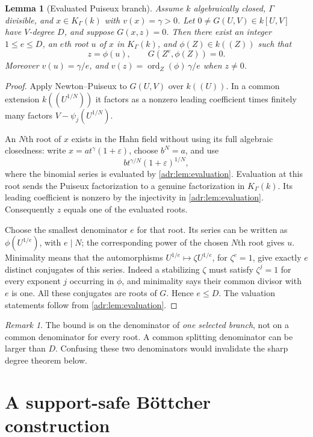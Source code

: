 \documentclass[11pt,letterpaper]{article}
\numberwithin{equation}{section}
\newtheorem{lemma}[lemma]{Lemma}
\theoremstyle{definition}
\theoremstyle{remark}
\newtheorem{remark}[remark]{Remark}
\newcommand{\K}{K_\Gamma(k)}
\newcommand{\ord}{\operatorname{ord}}
\begin{document}
\begin{lemma}[Evaluated Puiseux branch]\label{adr:lem:puiseux}
Assume $k$ algebraically closed, $\Gamma$ divisible, and $x\in\K$ with
$v(x)=\gamma>0$. Let $0\ne G(U,V)\in k[U,V]$ have $V$-degree $D$, and
suppose $G(x,z)=0$. Then there exist an integer $1\le e\le D$, an
$e$th root $u$ of $x$ in $\K$, and $\phi(Z)\in k((Z))$ such that
\begin{equation}\label{adr:eq:puiseux-branch}
 z=\phi(u),\qquad G(Z^e,\phi(Z))=0.
\end{equation}
Moreover $v(u)=\gamma/e$, and
$v(z)=\ord_Z(\phi)\,\gamma/e$ when $z\ne0$.
\end{lemma}
\begin{proof}
Apply Newton--Puiseux to $G(U,V)$ over $k((U))$. In a common extension
$k((U^{1/N}))$ it factors as a nonzero leading coefficient times finitely
many factors $V-\psi_j(U^{1/N})$.

An $N$th root of $x$ exists in the Hahn field without using its full
algebraic closedness: write $x=a t^\gamma(1+\varepsilon)$, choose
$b^N=a$, and use
\[
 b t^{\gamma/N}(1+\varepsilon)^{1/N},
\]
where the binomial series is evaluated by \cref{adr:lem:evaluation}.
Evaluation at this root sends the Puiseux factorization to a genuine
factorization in $\K$. Its leading coefficient is nonzero by the
injectivity in \cref{adr:lem:evaluation}. Consequently $z$ equals one of
the evaluated roots.

Choose the smallest denominator $e$ for that root. Its series can be
written as $\phi(U^{1/e})$, with $e\mid N$; the corresponding power of
the chosen $N$th root gives $u$. Minimality means that the automorphisms
$U^{1/e}\mapsto\zeta U^{1/e}$, for $\zeta^e=1$, give exactly $e$
distinct conjugates of this series. Indeed a stabilizing $\zeta$ must
satisfy $\zeta^j=1$ for every exponent $j$ occurring in $\phi$, and
minimality says their common divisor with $e$ is one. All these conjugates
are roots of $G$. Hence $e\le D$. The valuation statements follow from
\cref{adr:lem:evaluation}.
\end{proof}

\begin{remark}
The bound is on the denominator of \emph{one selected branch}, not on a
common denominator for every root. A common splitting denominator can be
larger than $D$. Confusing these two denominators would invalidate the
sharp degree theorem below.
\end{remark}

\section{A support-safe B\"ottcher construction}\label{adr:sec:bottcher}
\end{document}
